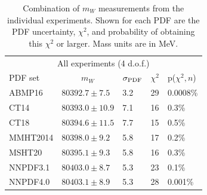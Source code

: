 \begin{table}[!tp]
  \centering
\begin{tabular}{lllll}
\hline \hline
                                     \multicolumn{5}{c}{All experiments (4 d.o.f.)} \\
PDF set                      & \multicolumn{1}{c}{$m_W$} & $\sigma_{\scriptsize\textrm{PDF}}$ & $\chi^2$ & p($\chi^2,n$) \\
\hline
                             ABMP16 & $80392.7 \pm  7.5$ &   3.2 &    29  & 0.0008\% \\
                               CT14 & $80393.0 \pm 10.9$ &   7.1 &    16  & 0.3\% \\
                               CT18 & $80394.6 \pm 11.5$ &   7.7 &    15  & 0.5\% \\
                           MMHT2014 & $80398.0 \pm  9.2$ &   5.8 &    17  & 0.2\% \\
                             MSHT20 & $80395.1 \pm  9.3$ &   5.8 &    16  & 0.3\% \\
                           NNPDF3.1 & $80403.0 \pm  8.7$ &   5.3 &    23   & 0.1\% \\
                           NNPDF4.0 & $80403.1 \pm  8.9$ &   5.3 &    28   & 0.001\% \\
\hline \hline
\end{tabular}
\caption{Combination of $m_W$ measurements from the individual experiments.
  Shown for each PDF are the PDF uncertainty, $\chi^2$, and probability of
  obtaining this $\chi^2$ or larger.  Mass units are in MeV.
  \label{tbl:all1_opt2}}
\end{table}


